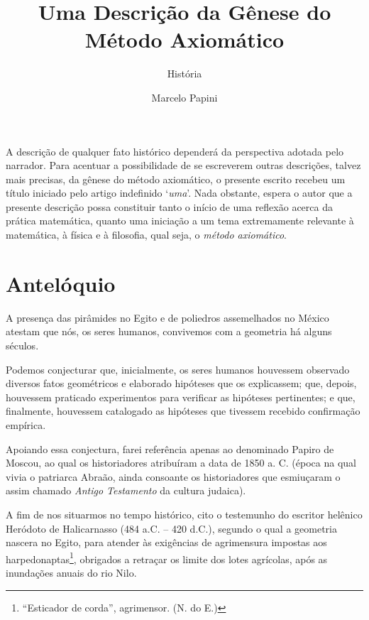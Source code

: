 \documentclass{hipatia}
\title{Uma Descrição da Gênese do\\ Método Axiomático}
\subtitle{História}
\author{Marcelo Papini
}
\begin{document}
\setcounter{page}{\historiapage}
\maketitle


A descrição de qualquer fato histórico dependerá da perspectiva adotada pelo narrador. Para   acentuar a possibilidade de se escreverem outras descrições, talvez mais precisas, da gênese do método axiomático, o presente escrito recebeu um título iniciado pelo artigo indefinido ‘\emph{uma}’.
Nada obstante, espera o autor que a presente descrição possa constituir tanto o início de uma reflexão acerca da prática matemática, quanto uma iniciação a um tema extremamente relevante à matemática, à física e à filosofia, qual seja, o \emph{método axiomático}.







\section{Antelóquio}

A presença das pirâmides no Egito e de poliedros assemelhados no México atestam que nós, os seres humanos, convivemos  com a geometria há alguns séculos. 

Podemos conjecturar que, inicialmente, os seres humanos houvessem observado diversos fatos geométricos e elaborado hipóteses que os explicassem;  que, depois, houvessem praticado experimentos para verificar as hipóteses pertinentes;  e que, finalmente, houvessem catalogado as hipóteses que tivessem recebido confirmação empírica. 

Apoiando essa conjectura, farei referência apenas ao denominado Papiro de Moscou, ao qual os historiadores atribuíram a data de 1850 a. C.  (época na qual vivia o patriarca Abraão, ainda consoante os historiadores que esmiuçaram o assim chamado \emph{Antigo Testamento} da cultura judaica).

A fim de nos situarmos no tempo histórico, cito o testemunho do escritor helênico Heródoto de Halicarnasso (484 a.C. – 420 d.C.), segundo o qual a geometria nascera no Egito, para atender às exigências de agrimensura impostas aos harpedonaptas\footnote{``Esticador de corda'', agrimensor. (N. do E.)}, obrigados a retraçar os limite dos lotes agrícolas, após as inundações anuais do rio Nilo. 
\end{document}
